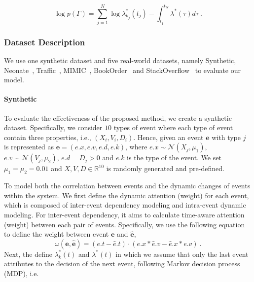 \begin{equation}
    \log p(\Gamma)=\sum_{j=1}^N \log \lambda_{k_j}^*\left(t_j\right)-\int_{t_1}^{t_N} \lambda^*(\tau) d \tau ~.
\end{equation}

\subsubsection{Dataset Description} 

We use one synthetic dataset and five real-world datasets, namely Synthetic, Neonate~\cite{stevenson2019dataset}, Traffic~\cite{lai2018modeling},
MIMIC~\cite{du2016recurrent}, BookOrder~\cite{du2016recurrent} and StackOverflow~\cite{leskovec2014snap} to evaluate our model. 

\paragraph{Synthetic}

To evaluate the effectiveness of the proposed method, we create a synthetic dataset. Specifically, we consider $10$ types of event where each type of event contain three properties, i.e., $(X_i, V_i, D_i)$. Hence, given an event $\textbf{e}$ with type $j$ is represented as $\textbf{e} = (e.x, e.v, e.d, e.k)$, where $e.x \sim \mathcal{N}(X_j, \mu_1)$, $e.v \sim \mathcal{N}(V_j, \mu_2)$, $e.d=D_j > 0 $ and $e.k$ is the type of the event. We set $\mu_1=\mu_2=0.01$ and $X, V, D \in \mathbb{R}^{10}$ is randomly generated and pre-defined.

To model both the correlation between events and the dynamic changes of events within the system. We first define the dynamic attention (weight) for each event, which is composed of inter-event dependency modeling and intra-event dynamic modeling. For inter-event dependency, it aims to calculate time-aware attention (weight) between each pair of events. Specifically, we use the following equation to define the weight between event $\textbf{e}$ and $\hat{\textbf{e}}$,
\begin{equation}
    \omega(\textbf{e}, \hat{\textbf{e}}) = (e.t - \hat{e}.t) \cdot (e.x * \hat{e}.v - \hat{e}.x * e.v) ~.
\end{equation}
Next, the define $\lambda_{k}^{*}(t)$ and $\lambda^{*}(t)$ in which we assume that only the last event attributes to the decision of the next event, following Markov decision process (MDP), i.e.

